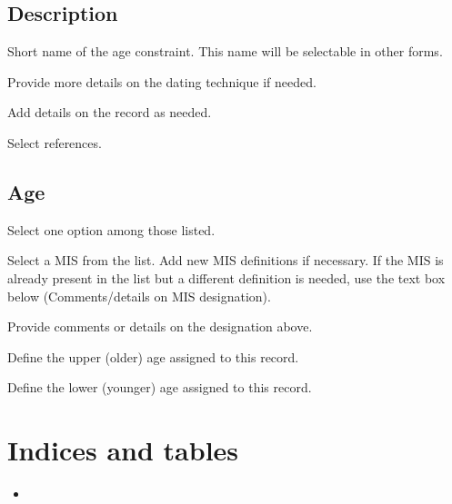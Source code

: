 \documentclass[letterpaper,10pt,english]{sphinxmanual}
\begin{document}
\section{Description}
\label{\detokenize{Other_age:description}}
 \sphinxhyphen{} Short name of the age constraint. This name will be selectable in other forms.

 \sphinxhyphen{} Provide more details on the dating technique if needed.

 \sphinxhyphen{} Add details on the record as needed.

 \sphinxhyphen{} Select references.


\section{Age}
\label{\detokenize{Other_age:age}}
 \sphinxhyphen{} Select one option among those listed.

 \sphinxhyphen{} Select a MIS from the list. Add new MIS definitions if necessary. If the MIS is already present in the list but a different definition is needed, use the text box below (Comments/details on MIS designation).

 \sphinxhyphen{} Provide comments or details on the designation above.

 \sphinxhyphen{} Define the upper (older) age assigned to this record.

 \sphinxhyphen{} Define the lower (younger) age assigned to this record.


\chapter{Indices and tables}
\label{\detokenize{index:indices-and-tables}}\begin{itemize}
\item {} 

\end{itemize}



\renewcommand{\indexname}{Index}
\printindex
\end{document}
